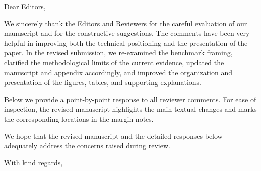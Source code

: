 \noindent
Dear Editors,

\vspace{2em}

We sincerely thank the Editors and Reviewers for the careful evaluation of our manuscript and for the constructive suggestions. The comments have been very helpful in improving both the technical positioning and the presentation of the paper. In the revised submission, we re-examined the benchmark framing, clarified the methodological limits of the current evidence, updated the manuscript and appendix accordingly, and improved the organization and presentation of the figures, tables, and supporting explanations.

Below we provide a point-by-point response to all reviewer comments. For ease of inspection, the revised manuscript highlights the main textual changes and marks the corresponding locations in the margin notes.

We hope that the revised manuscript and the detailed responses below adequately address the concerns raised during review.

\vspace{2em}

With kind regards,
\begin{flushright}
	\AuthorsInSignature
\end{flushright}


